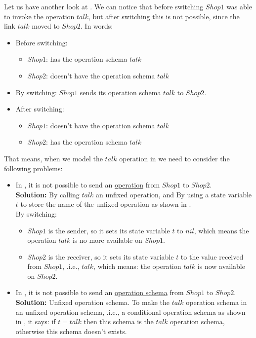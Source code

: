 Let us have another look at . We can notice that before switching $Shop1$ was able to invoke the operation $talk$, but after switching this is not possible, since the link $talk$ moved to $Shop2$. In \oz{} words:
\begin{itemize}
\item Before switching:
	\begin{itemize}
	\item $Shop1$: has the operation schema $talk$
	\item $Shop2$: doesn't have the operation schema $talk$
	\end{itemize}
\item By switching: $Shop1$ sends its operation schema $talk$ to $Shop2$.
\item After switching:
	\begin{itemize}
	\item $Shop1$: doesn't have the operation schema $talk$
	\item $Shop2$: has the operation schema $talk$
	\end{itemize}
\end{itemize}
That means, when we model the $talk$ operation in \oz{} we need to consider the following problems: 

\begin{itemize}
\item In \oz{}, it is not possible to send an \underline{operation} from $Shop1$ to $Shop2$.\\
\textbf{Solution:} By calling $talk$ an unfixed operation, and By using a state variable $t$ to store the name of the unfixed operation as shown in .\\
By switching:
\begin{itemize}
\item $Shop1$ is the sender, so it sets its state variable $t$ to $nil$, which means the operation $talk$ is no more available on $Shop1$.
\item $Shop2$ is the receiver, so it sets its state variable $t$ to the value received from $Shop1$, .i.e., $talk$, which means: the operation $talk$ is now available on $Shop2$.
\end{itemize}
\item In \oz{}, it is not possible to send an \underline{operation schema} from $Shop1$ to $Shop2$.\\
\textbf{Solution:} Unfixed operation schema. To make the $talk$ operation schema in  an unfixed operation schema, .i.e., a conditional operation schema as shown in , it says: if $t = talk$ then this schema is the $talk$ operation schema, otherwise this schema doesn't exists.

\end{itemize}



